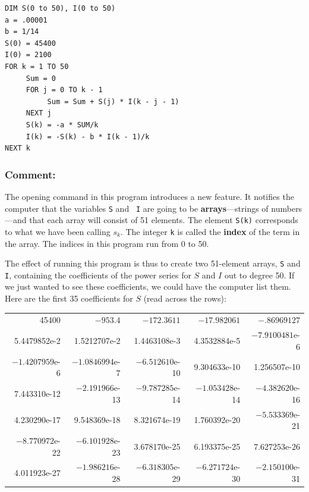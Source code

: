 \begin{verbatim}
DIM S(0 to 50), I(0 to 50)
a = .00001
b = 1/14
S(0) = 45400
I(0) = 2100
FOR k = 1 TO 50
     Sum = 0
     FOR j = 0 TO k - 1
          Sum = Sum + S(j) * I(k - j - 1)
     NEXT j
     S(k) = -a * SUM/k
     I(k) = -S(k) - b * I(k - 1)/k
NEXT k
\end{verbatim}


\subsubsection{Comment:}
The opening command in this program introduces a new
feature. It notifies the computer that the variables {\tt S} and {\tt
  I} are going to be {\bf arrays}---strings of
numbers---and that each array will consist of 51 elements.  The
element {\tt S(k)} corresponds to what we have been calling $s_k$.
The integer {\tt k} is called the {\bf index} of the term
in the array.  The indices in this program run from 0 to 50.

The effect of running this program is thus to create two 51-element
arrays, {\tt S} and {\tt I}, containing the coefficients of the power
series for $S$ and $I$ out to degree 50.  If we just wanted to see
these coefficients, we could have the computer list them.  Here are
the first 35 coefficients for $S$ (read across the rows):




\begin{small}
\hspace{-25pt}


\begin{tabular}{rrrrr}
45400    &    $-953.4$  &  $-172.3611$   &  $-17.982061$  &  $-.86969127$ \\
5.4479852e-2 & 1.5212707e-2 &1.4463108e-3  &  4.3532884e-5 &$-7.9100481$e-6\\
$-1.4207959$e-6&$-1.0846994$e-7&$-6.512610$e-10 &9.304633e-10 &1.256507e-10 \\
7.443310e-12&$-2.191966$e-13&$-9.787285$e-14&$-1.053428$e-14&$-4.382620$e-16\\
4.230290e-17 & 9.548369e-18 & 8.321674e-19 & 1.760392e-20  & $-5.533369$e-21\\
$-8.770972$e-22&$-6.101928$e-23&3.678170e-25& 6.193375e-25  & 7.627253e-26 \\ 4.011923e-27&$-1.986216$e-28&$-6.318305$e-29&$-6.271724$e-30&$-2.150100$e-31 \\ \end{tabular}
\end{small}





